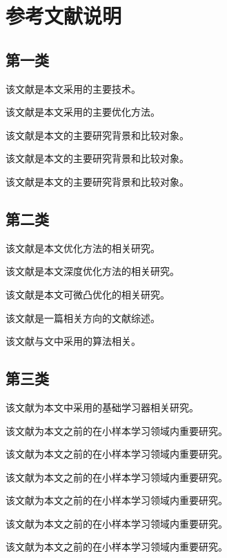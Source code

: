 \chapter{参考文献说明}

\section{第一类}

\cite{amos2017optnet} 该文献是本文采用的主要技术。

\cite{bertinetto2018meta} 该文献是本文采用的主要优化方法。

\cite{bertinetto2018meta} 该文献是本文的主要研究背景和比较对象。

\cite{caruana2008empirical} 该文献是本文的主要研究背景和比较对象。

\cite{crammer2001algorithmic} 该文献是本文的主要研究背景和比较对象。

\section{第二类}

\cite{domke2012generic} 该文献是本文优化方法的相关研究。

\cite{finn2017model} 该文献是本文深度优化方法的相关研究。

\cite{gould2016differentiating} 该文献是本文可微凸优化的相关研究。

\cite{krantz2002implicit} 该文献是一篇相关方向的文献综述。

\cite{maclaurin2015gradient} 该文献与文中采用的算法相关。

\section{第三类}

\cite{malisiewicz2011ensemble} 该文献为本文中采用的基础学习器相关研究。

\cite{mishra2017simple} 该文献为本文之前的在小样本学习领域内重要研究。

\cite{munkhdalai2018rapid} 该文献为本文之前的在小样本学习领域内重要研究。

\cite{oreshkin2018tadam} 该文献为本文之前的在小样本学习领域内重要研究。

\cite{ravi2017optimization} 该文献为本文之前的在小样本学习领域内重要研究。

\cite{ren2018meta} 该文献为本文之前的在小样本学习领域内重要研究。

\cite{rusu2018meta} 该文献为本文之前的在小样本学习领域内重要研究。

